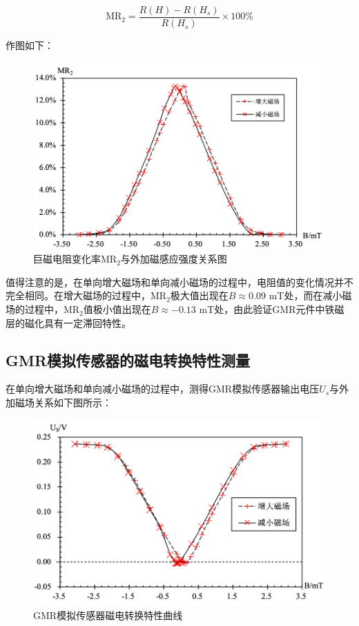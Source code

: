\documentclass{thuemp}
\begin{document}
\begin{equation}\label{eq:mr2}
    \mathrm{MR_2} = \frac{R(H) - R(H_s)}{R(H_s)} \times 100\%
\end{equation}

作图如下：
\begin{figure}[H]
    \centering
    \includegraphics[width=0.9\linewidth]{../Data/GMR-Plot-01-02-excel.png}
    \caption{巨磁电阻变化率$\mathrm{MR_2}$与外加磁感应强度关系图} \label{fig:magnetoresistance}
\end{figure}

值得注意的是，在单向增大磁场和单向减小磁场的过程中，电阻值的变化情况并不完全相同。在增大磁场的过程中，$\mathrm{MR_2}$极大值出现在$B\approx 0.09$ \si{\milli\tesla}处，而在减小磁场的过程中，$\mathrm{MR_2}$值极小值出现在$B\approx -0.13$ \si{\milli\tesla}处，由此验证GMR元件中铁磁层的磁化具有一定滞回特性。

\subsection{GMR模拟传感器的磁电转换特性测量}

在单向增大磁场和单向减小磁场的过程中，测得GMR模拟传感器输出电压$U_s$与外加磁场关系如下图所示：

\begin{figure}[H]
    \centering
    \includegraphics[width=0.9\linewidth]{../Data/GMR-Plot-02-excel.png}
    \caption{GMR模拟传感器磁电转换特性曲线} \label{fig:gmrsensor}
\end{figure}
\end{document}
